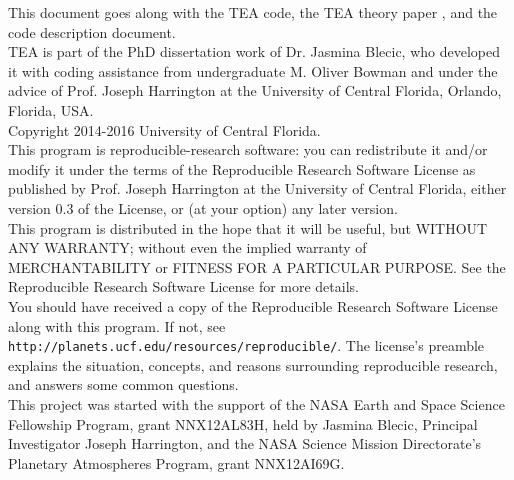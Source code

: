 \clearpage
\vspace*{\fill}
\begin{center}
\begin{minipage}{.8\textwidth}


\vspace{20pt} This document goes along with the TEA code, the TEA theory
paper \citep{BlecicEtal2016-TEAtheory}, and the code description
document.  \\

 TEA is part of the PhD dissertation work of Dr. Jasmina                   
Blecic, who developed it with coding assistance from                       
undergraduate M. Oliver Bowman and under the advice of                     
Prof. Joseph Harrington at the University of Central Florida,              
Orlando, Florida, USA.   \\      

\hspace{60pt} Copyright  \textcopyright \hspace{1pt} 2014-2016 University of Central Florida. \\   

This program is reproducible-research software: you can                    
redistribute it and/or modify it under the terms of the                    
Reproducible Research Software License as published by                     
Prof. Joseph Harrington at the University of Central Florida,              
either version 0.3 of the License, or (at your option) any later           
version.  \\   
                                                             
This program is distributed in the hope that it will be useful,            
but WITHOUT ANY WARRANTY; without even the implied warranty of             
MERCHANTABILITY or FITNESS FOR A PARTICULAR PURPOSE.  See the              
Reproducible Research Software License for more details.  \\                 

You should have received a copy of the Reproducible Research               
Software License along with this program.  If not, see                     
{\tt http://planets.ucf.edu/resources/reproducible/}.  The license's           
preamble explains the situation, concepts, and reasons surrounding         
reproducible research, and answers some common questions.  \\                

This project was started with the support of the NASA Earth and            
Space Science Fellowship Program, grant NNX12AL83H, held by                
Jasmina Blecic, Principal Investigator Joseph Harrington, and the          
NASA Science Mission Directorate’s Planetary Atmospheres Program,          
grant NNX12AI69G.     \\                                                     
                                                                           

\end{minipage}
\end{center}
